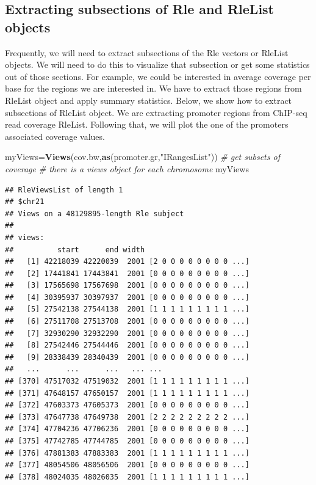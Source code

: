 \documentclass[12pt,]{krantz}
\newenvironment{Shaded}{\begin{snugshade}}{\end{snugshade}}
\newcommand{\CommentTok}[1]{\textcolor[rgb]{0.56,0.35,0.01}{\textit{#1}}}
\newcommand{\KeywordTok}[1]{\textcolor[rgb]{0.13,0.29,0.53}{\textbf{#1}}}
\newcommand{\NormalTok}[1]{#1}
\newcommand{\StringTok}[1]{\textcolor[rgb]{0.31,0.60,0.02}{#1}}
\begin{document}
\hypertarget{extracting-subsections-of-rle-and-rlelist-objects}{%
\subsection{Extracting subsections of Rle and RleList objects}\label{extracting-subsections-of-rle-and-rlelist-objects}}

Frequently, we will need to extract subsections of the Rle vectors or RleList objects.
We will need to do this to visualize that subsection or get some statistics out
of those sections. For example, we could be interested in average coverage per
base for the regions we are interested in. We have to extract those regions
from RleList object and apply summary statistics. Below, we show how to extract
subsections of RleList object. We are extracting promoter regions from ChIP-seq
read coverage RleList. Following that, we will plot the one of the promoters associated coverage values.

\begin{Shaded}
\begin{Highlighting}[]
\NormalTok{myViews=}\KeywordTok{Views}\NormalTok{(cov.bw,}\KeywordTok{as}\NormalTok{(promoter.gr,}\StringTok{"IRangesList"}\NormalTok{)) }\CommentTok{# get subsets of coverage}
\CommentTok{# there is a views object for each chromosome}
\NormalTok{myViews}
\end{Highlighting}
\end{Shaded}

\begin{verbatim}
## RleViewsList of length 1
## $chr21
## Views on a 48129895-length Rle subject
## 
## views:
##          start      end width
##   [1] 42218039 42220039  2001 [2 0 0 0 0 0 0 0 0 ...]
##   [2] 17441841 17443841  2001 [0 0 0 0 0 0 0 0 0 ...]
##   [3] 17565698 17567698  2001 [0 0 0 0 0 0 0 0 0 ...]
##   [4] 30395937 30397937  2001 [0 0 0 0 0 0 0 0 0 ...]
##   [5] 27542138 27544138  2001 [1 1 1 1 1 1 1 1 1 ...]
##   [6] 27511708 27513708  2001 [0 0 0 0 0 0 0 0 0 ...]
##   [7] 32930290 32932290  2001 [0 0 0 0 0 0 0 0 0 ...]
##   [8] 27542446 27544446  2001 [0 0 0 0 0 0 0 0 0 ...]
##   [9] 28338439 28340439  2001 [0 0 0 0 0 0 0 0 0 ...]
##   ...      ...      ...   ... ...
## [370] 47517032 47519032  2001 [1 1 1 1 1 1 1 1 1 ...]
## [371] 47648157 47650157  2001 [1 1 1 1 1 1 1 1 1 ...]
## [372] 47603373 47605373  2001 [0 0 0 0 0 0 0 0 0 ...]
## [373] 47647738 47649738  2001 [2 2 2 2 2 2 2 2 2 ...]
## [374] 47704236 47706236  2001 [0 0 0 0 0 0 0 0 0 ...]
## [375] 47742785 47744785  2001 [0 0 0 0 0 0 0 0 0 ...]
## [376] 47881383 47883383  2001 [1 1 1 1 1 1 1 1 1 ...]
## [377] 48054506 48056506  2001 [0 0 0 0 0 0 0 0 0 ...]
## [378] 48024035 48026035  2001 [1 1 1 1 1 1 1 1 1 ...]
\end{verbatim}
\end{document}
